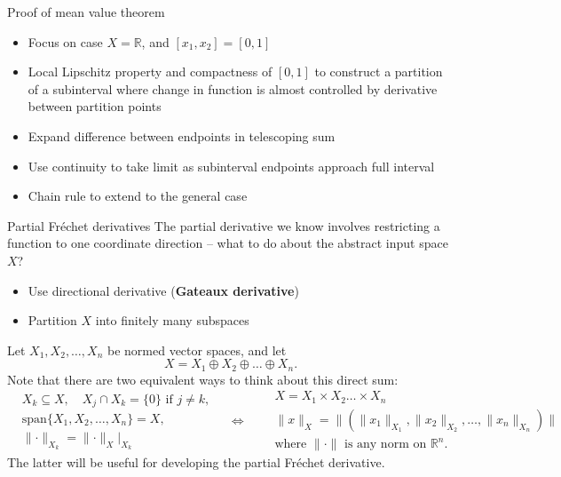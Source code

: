 \documentclass[]{beamer}
\begin{document}
	\begin{frame}{Proof of mean value theorem}
		\begin{itemize}
			\item Focus on case $X = \mathbb{R}$, and $[x_1, x_2] = [0, 1]$
			\vfill
			\item Local Lipschitz property and compactness of $[0,1]$ to construct a partition of a subinterval where change in function is almost controlled by derivative between partition points
			\vfill
			\item Expand difference between endpoints in telescoping sum
			\vfill
			\item Use continuity to take limit as subinterval endpoints approach full interval
			\vfill
			\item Chain rule to extend to the general case
		\end{itemize}
	\end{frame}
	
	\begin{frame}{Partial Fréchet derivatives}
		The partial derivative we know involves restricting a function to one coordinate direction -- what to do about the abstract input space $X$?
		\begin{itemize}
			\item Use directional derivative (\textbf{Gateaux derivative})
			\item Partition $X$ into finitely many subspaces
		\end{itemize}
		\vfill
		Let $X_1, X_2, \dots, X_n$ be normed vector spaces, and let
		\begin{equation*}
			X = X_1 \oplus X_2 \oplus \dots \oplus X_n.
		\end{equation*}
		Note that there are two equivalent ways to think about this direct sum:
		{\tiny
		\begin{equation*}
			\begin{split}
				&X_k \subseteq X, \quad X_j \cap X_k = \{0\} \text{ if } j \ne k, \\
				&\mathrm{span}\{X_1, X_2, \dots, X_n\} = X, \\
				&\lVert \cdot \rVert_{X_k} = \lVert \cdot \rVert_X \big\vert_{X_k}
			\end{split}
			\quad \iff \quad
			\begin{split}
				&X = X_1 \times X_2 \dots \times X_n \\
				&\lVert x \rVert_X = \lVert (\lVert x_1\rVert_{X_1}, \lVert x_2\rVert_{X_2}, \dots, \lVert x_n\rVert_{X_n})\rVert\\
				&\text{where $\lVert\cdot\rVert$ is any norm on $\mathbb{R}^n$}.
			\end{split}
		\end{equation*}
		}%
		The latter will be useful for developing the partial Fréchet derivative.
	\end{frame}
	
\end{document}
